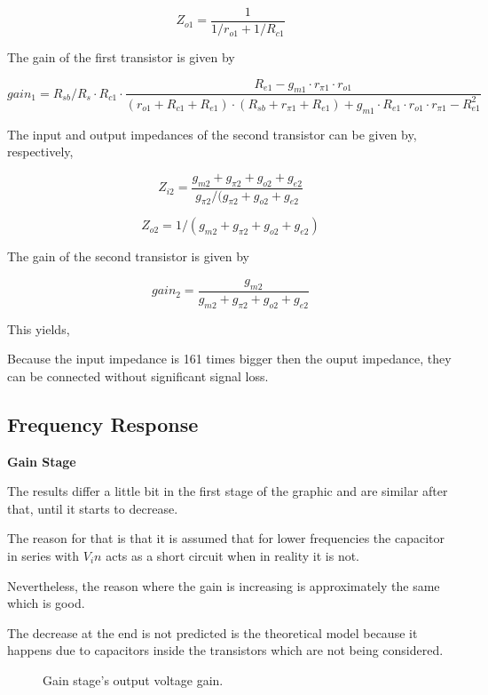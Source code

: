 $$Z_{o1} = \frac {1}{1/r_{o1}+1/R_{c1}}$$

The gain of the first transistor is given by

$$gain_1=R_{sb}/R_{s}\cdot R_{c1}\cdot \frac {R_{e1}-g_{m1}\cdot r_{\pi 1}\cdot r_{o1}}{(r_{o1}+R_{c1}+R_{e1})\cdot (R_{sb}+r_{\pi 1}+R_{e1})+g_{m1}\cdot R_{e1}\cdot r_{o1}\cdot r_{\pi 1} - R_{e1}^2} $$

The input and output impedances of the second transistor can be given by, respectively,

$$Z_{i2} = \frac {g_{m2}+g_{\pi 2}+g_{o2}+g_{e2}}{g_{\pi 2}/(g_{\pi 2}+g_{o2}+g_{e2}}$$

$$Z_{o2} = 1/(g_{m2}+g_{\pi 2}+g_{o2}+g_{e2})$$

The gain of the second transistor is given by

$$gain_2 =\frac { g_{m2}}{g_{m2}+g_{\pi 2}+g_{o2}+g_{e2}}$$

This yields,


\vspace{1cm}

Because the input impedance is 161 times bigger then the ouput impedance, they can be connected without significant signal loss.



\subsection{Frequency Response}

\textbf{Gain Stage} 

 The results differ a little bit in the first stage of the graphic and are similar after that, until it starts to decrease.
 
 The reason for that is that it is assumed that for lower frequencies the capacitor in series with $V_in$ acts as a short circuit when in reality it is not.
 
 Nevertheless, the reason where the gain is increasing is approximately the same which is good.
 
 The decrease at the end is not predicted is the theoretical model because it happens due to capacitors inside the transistors which are not being considered.

\begin{figure}[h]
    \centering
{}
  \hfill
{}
\caption{Gain stage's output voltage gain.}
\end{figure}

